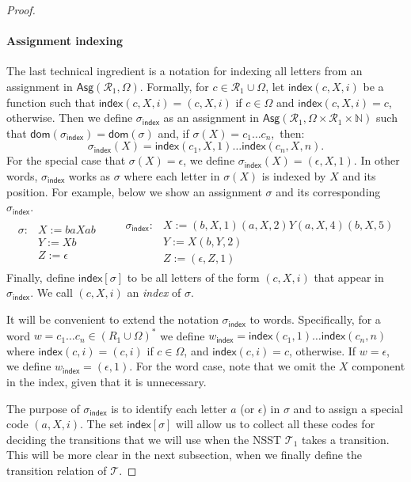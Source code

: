 \documentclass[
a4paper
]{article}
\theoremstyle{plain}
\theoremstyle{definition}
\theoremstyle{remark}
\newcommand{\dom}{\operatorname{dom}}
\newcommand{\Reg}{\mathcal{R}}
\newcommand{\Asg}{\operatorname{Asg}}
\newcommand{\nsst}{\mathcal{T}}
\newcommand{\indx}{\operatorname{index}}
\newcommand{\indxsigma}{\sigma_{\indx}}
\newcommand{\indxw}{w_{\indx}}
\newcommand{\bbN}{\mathbb{N}}
\renewcommand{\operatorname}[1]{\textsf{#1}}
\begin{document}
\begin{proof}
\paragraph{Assignment indexing} The last technical ingredient is a notation for indexing all letters from an assignment in $\Asg(\Reg_1, \Omega)$. 
Formally, for $c \in \Reg_1 \cup \Omega$, let $\indx(c, X, i)$ be a function such that $\indx(c, X, i) = (c,X,i)$ if $c \in \Omega$ and $\indx(c, X, i) = c$, otherwise. 
Then we define $\indxsigma$ as an assignment in $\Asg(\Reg_1, \Omega \times \Reg_1 \times \bbN)$ such that $\dom(\indxsigma) = \dom(\sigma)$ and, if $\sigma(X) = c_1 \ldots c_n$,~then:
\[
\indxsigma(X) = \indx(c_1, X, 1) \ldots \indx(c_n, X, n).
\]
For the special case that $\sigma(X) = \epsilon$, we define $\indxsigma(X) = (\epsilon, X, 1)$.
In other words, $\indxsigma$ works as $\sigma$ where each letter in $\sigma(X)$ is indexed by $X$ and its position. For example, below we show an assignment $\sigma$ and its corresponding $\indxsigma$.
\[
\begin{array}{ll}
\begin{array}{rl}
	\sigma: \!\! & X := baXab \\
	& Y := X b \\
	& Z := \epsilon 
\end{array} & \ \ \ \ \ 
\begin{array}{rl}
	\indxsigma: \!\! & X := (b,X,1) (a,X,2) Y (a,X,4) (b,X,5) \\
	& Y := X (b,Y,2) \\
	& Z := (\epsilon, Z, 1)
\end{array} 
\end{array}
\]
Finally, define $\indx[\sigma]$ to be all letters of the form $(c,X,i)$ that appear in $\indxsigma$. We call $(c,X,i)$ an \emph{index} of $\sigma$. 

It will be convenient to extend the notation $\indxsigma$ to words. Specifically, for a word $w = c_1 \ldots c_n \in (R_1 \cup \Omega)^*$ we define $\indxw = \indx(c_1, 1) \ldots \indx(c_n, n)$ where $\indx(c,i) = (c,i)$ if $c\in \Omega$, and $\indx(c,i) = c$, otherwise. If $w = \epsilon$, we define $\indxw = (\epsilon, 1)$. For the word case, note that we omit the $X$ component in the index, given that it is unnecessary. 

The purpose of $\indxsigma$ is to identify each letter $a$ (or $\epsilon$) in $\sigma$ and to assign a special code $(a,X,i)$. The set $\indx[\sigma]$ will allow us to collect all these codes for deciding the transitions that we will use when the NSST $\nsst_1$ takes a transition. This will be more clear in the next subsection, when we finally define the transition relation of $\nsst$.


\end{proof}
\end{document}
